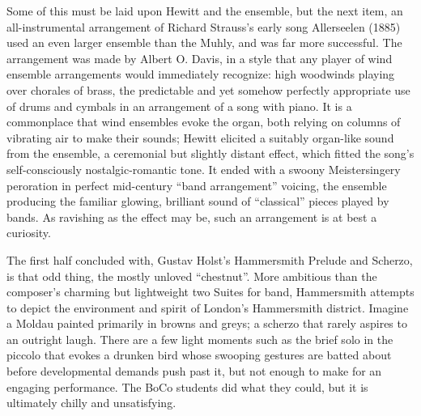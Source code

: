 Some of this must be laid upon Hewitt and the ensemble, but the next item, an all-instrumental arrangement of Richard Strauss’s early song Allerseelen (1885) used an even larger ensemble than the Muhly, and was far more successful. The arrangement was made by Albert O. Davis, in a style that any player of wind ensemble arrangements would immediately recognize: high woodwinds playing over chorales of brass, the predictable and yet somehow perfectly appropriate use of drums and cymbals in an arrangement of a song with piano. It is a commonplace that wind ensembles evoke the organ, both relying on columns of vibrating air to make their sounds; Hewitt elicited a suitably organ-like sound from the ensemble, a ceremonial but slightly distant effect, which fitted the song’s self-consciously nostalgic-romantic tone. It ended with a swoony Meistersingery peroration in perfect mid-century “band arrangement” voicing, the ensemble producing the familiar glowing, brilliant sound of “classical” pieces played by bands. As ravishing as the effect may be, such an arrangement is at best a curiosity.

The first half concluded with, Gustav Holst’s Hammersmith Prelude and Scherzo, is that odd thing, the mostly unloved “chestnut”. More ambitious than the composer’s charming but lightweight two Suites for band, Hammersmith attempts to depict the environment and spirit of London’s Hammersmith district. Imagine a Moldau painted primarily in browns and greys; a scherzo that rarely aspires to an outright laugh. There are a few light moments such as the brief solo in the piccolo that evokes a drunken bird whose swooping gestures are batted about before developmental demands push past it, but not enough to make for an engaging performance. The BoCo students did what they could, but it is ultimately chilly and unsatisfying.

